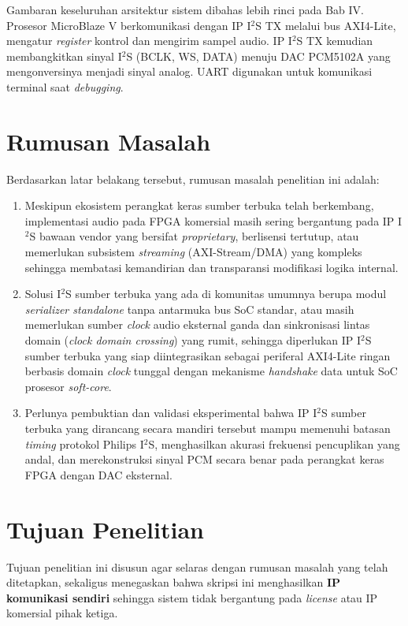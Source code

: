 Gambaran keseluruhan arsitektur sistem dibahas lebih rinci pada Bab IV. Prosesor MicroBlaze V berkomunikasi dengan IP I$^2$S TX melalui bus AXI4-Lite, mengatur \textit{register} kontrol dan mengirim sampel audio. IP I$^2$S TX kemudian membangkitkan sinyal I$^2$S (BCLK, WS, DATA) menuju DAC PCM5102A yang mengonversinya menjadi sinyal analog. UART digunakan untuk komunikasi terminal saat \textit{debugging}.

\section{Rumusan Masalah}

Berdasarkan latar belakang tersebut, rumusan masalah penelitian ini adalah:

\begin{enumerate}
	\item Meskipun ekosistem perangkat keras sumber terbuka telah berkembang, implementasi audio pada FPGA komersial masih sering bergantung pada IP I$^2$S bawaan vendor yang bersifat \textit{proprietary}, berlisensi tertutup, atau memerlukan subsistem \textit{streaming} (AXI-Stream/DMA) yang kompleks sehingga membatasi kemandirian dan transparansi modifikasi logika internal.
	\item Solusi I$^2$S sumber terbuka yang ada di komunitas umumnya berupa modul \textit{serializer standalone} tanpa antarmuka bus SoC standar, atau masih memerlukan sumber \textit{clock} audio eksternal ganda dan sinkronisasi lintas domain (\textit{clock domain crossing}) yang rumit, sehingga diperlukan IP I$^2$S sumber terbuka yang siap diintegrasikan sebagai periferal AXI4-Lite ringan berbasis domain \textit{clock} tunggal dengan mekanisme \textit{handshake} data untuk SoC prosesor \textit{soft-core}.
	\item Perlunya pembuktian dan validasi eksperimental bahwa IP I$^2$S sumber terbuka yang dirancang secara mandiri tersebut mampu memenuhi batasan \textit{timing} protokol Philips I$^2$S, menghasilkan akurasi frekuensi pencuplikan yang andal, dan merekonstruksi sinyal PCM secara benar pada perangkat keras FPGA dengan DAC eksternal.
\end{enumerate}

\section{Tujuan Penelitian}

Tujuan penelitian ini disusun agar selaras dengan rumusan masalah yang telah ditetapkan, sekaligus menegaskan bahwa skripsi ini menghasilkan \textbf{IP komunikasi sendiri} sehingga sistem tidak bergantung pada \textit{license} atau IP komersial pihak ketiga.

